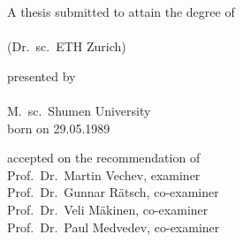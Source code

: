 \begin{titlepage}
    \begin{center}
        \large
        \begingroup
        \endgroup

        \hfill

        \vfill

        \begingroup
            \spacedallcaps{\myTitle}
        \endgroup

        \vfill

        \begingroup
            A thesis submitted to attain the degree of\\
            \vspace{0.5em}
            \\
            (Dr.\ sc.\ ETH Zurich)
        \endgroup

        \vfill

        \begingroup
            presented by\\
            \vspace{0.5em}
            \spacedlowsmallcaps{\myName}\\
            M.\ sc.\ Shumen University \\
            \vspace{0.5em}
            born on 29.05.1989%
        \endgroup

        \vfill

        \begingroup
            accepted on the recommendation of\\
            \vspace{0.5em}
            Prof.\ Dr.\ Martin Vechev, examiner\\ 
            Prof.\ Dr.\ Gunnar Rätsch, co-examiner\\
            Prof.\ Dr.\ Veli Mäkinen, co-examiner\\
            Prof.\ Dr.\ Paul Medvedev, co-examiner
        \endgroup

        \vfill

        \myTime%

        \vfill
    \end{center}
\end{titlepage}
